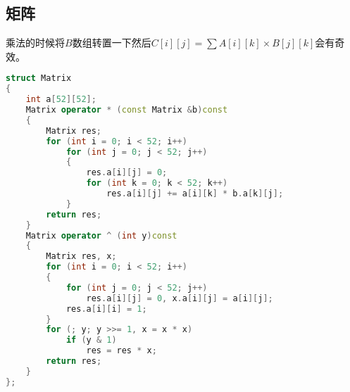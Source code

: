 \subsection{矩阵}
    乘法的时候将$B$数组转置一下然后$C[i][j] = \sum{A[i][k]\times B[j][k]}$会有奇效。
    \begin{lstlisting}[language=c++]
struct Matrix
{
    int a[52][52];
    Matrix operator * (const Matrix &b)const
    {
        Matrix res;
        for (int i = 0; i < 52; i++)
            for (int j = 0; j < 52; j++)
            {
                res.a[i][j] = 0;
                for (int k = 0; k < 52; k++)
                    res.a[i][j] += a[i][k] * b.a[k][j];
            }
        return res;
    }
    Matrix operator ^ (int y)const
    {
        Matrix res, x;
        for (int i = 0; i < 52; i++)
        {
            for (int j = 0; j < 52; j++)
                res.a[i][j] = 0, x.a[i][j] = a[i][j];
            res.a[i][i] = 1;
        }
        for (; y; y >>= 1, x = x * x)
            if (y & 1)
                res = res * x;
        return res;
    }
};
    \end{lstlisting}
